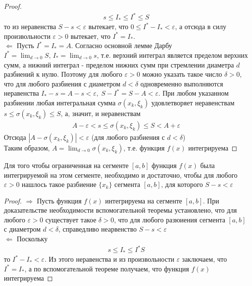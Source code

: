 \documentclass[10pt]{article}
\begin{document}
\begin{proof}
        \begin{gather*}
            s \leq I_* \leq I^* \leq S
        \end{gather*}
        то из неравенства $S-s < \varepsilon$ вытекает, что $0 \leq I^* - I_* < \varepsilon$, а отсюда в силу произвольности $\varepsilon > 0$ вытекает, что $I^* = I_*$.\\
        $\Leftarrow$
        Пусть $I^*=I_*=A$. Согласно основной лемме Дарбу $I^* = \lim_{d \to 0} S,\, I_*=\lim_{d \to 0} s$, т.е. верхний интеграл является пределом верхних сумм, а нижний интеграл - пределом нижних сумм при стремлении диаметра $d$ разбиений к нулю. Поэтому для любого $\varepsilon > 0$ можно указать такое число $\delta > 0$, что для любого разбиения с диаметром $d < \delta$ одновременно выполняются неравенства $I_* - s = A-s<\varepsilon,\;S-I^*=S-A<\varepsilon$. При любом указанном разбиении любая интегральная сумма $\sigma(x_k, \xi_k)$ удовлетворяет неравенствам $s \leq \sigma(x_k, \xi_k) \leq S$, а, значит, и неравенствам
        \begin{gather*}
            A - \varepsilon < s \leq \sigma(x_k, \xi_k) \leq S < A + \varepsilon
        \end{gather*}
        Отсюда $|A - \sigma(x_k, \xi_k)| < \varepsilon$ (для любого разбиения с $d < \delta$)\\
        Таким образом, $A = \lim_{d \to 0} \sigma(x_k, \xi_k)$, т.е. функция $f(x)$ интегрируема
    \end{proof}
    \begin{theorem}
        Для того чтобы ограниченная на сегменте $[a, b]$ функция $f(x)$ была интегрируемой на этом сегменте, необходимо и достаточно, чтобы для любого $\varepsilon > 0$ нашлось такое разбиение $\{x_k\}$ сегмента $[a, b]$, для которого $S - s < \varepsilon$
    \end{theorem}
    \begin{proof}
        
        $\Rightarrow$
        Пусть функция $f(x)$ интегрируема на сегменте $[a, b]$. При доказательстве необходимости вспомогательной теоремы установлено, что для любого $\varepsilon > 0$ существует такое $\delta > 0$, что для любого разюиения сегмента $[a, b]$ с диаметром $d < \delta$, справедливо неарвенство $S-s < \varepsilon$\\
        $\Leftarrow$
        Поскольку
        \begin{gather*}
            s \leq I_* \leq I^* S
        \end{gather*}
        то $I^* - I_* < \varepsilon$. Из этого неравенства и из произвольности $\varepsilon$ заключаем, что $I^* = I_*$, а по вспомогательной теореме получаем, что функция $f(x)$ интегрируема
    \end{proof}
\end{document}
